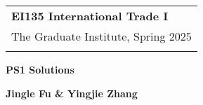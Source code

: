 \documentclass[a4paper,12pt]{article} %
\theoremstyle{nonitalic}
\begin{document}
\thispagestyle{empty} %

\begin{tabular}{p{15.5cm}} %
{\large \bf EI135 International Trade I} \\
The Graduate Institute, Spring 2025\\
\hline %
\\
\end{tabular} %

\vspace*{0.3cm} %

\begin{center} %
	{\Large \bf PS1 Solutions} %
	\vspace{2mm}
	
	{\bf Jingle Fu \& Yingjie Zhang} %
		
\end{center}  

\vspace{0.4cm}
\end{document}
